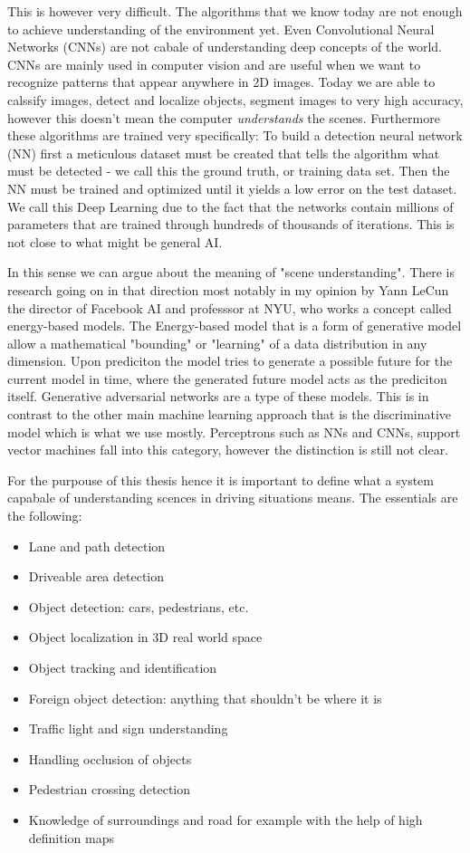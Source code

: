 This is however very difficult. The algorithms that we know today are not enough
to achieve understanding of the environment yet. Even Convolutional Neural
Networks (CNNs) are not cabale of understanding deep concepts of the world. CNNs
are mainly used in computer vision and are useful when we want to recognize
patterns that appear anywhere in 2D images. Today we are able to calssify
images, detect and localize objects, segment images to very high accuracy,
however this doesn't mean the computer \emph{understands} the scenes.
Furthermore these algorithms are trained very specifically: To build a detection
neural network (NN) first a meticulous dataset must be created that tells the
algorithm what must be detected - we call this the ground truth, or training
data set. Then the NN must be trained and optimized until it yields a low error
on the test dataset. We call this Deep Learning due to the fact that the networks
contain millions of parameters that are trained through hundreds of thousands of
iterations. This is not close to what might be general AI.

In this sense we can argue about the meaning of "scene understanding". There is
research going on in that direction most notably in my opinion by Yann LeCun the
director of Facebook AI and professsor at NYU, who works a concept called
energy-based models. The Energy-based model that is a form of generative model
allow a mathematical "bounding" or "learning" of a data distribution in any
dimension. Upon prediciton the model tries to generate a possible future for the
current model in time, where the generated future model acts as the prediciton
itself. Generative adversarial networks are a type of these models. This is in
contrast to the other main machine learning approach that is the discriminative
model which is what we use mostly. Perceptrons such as NNs and CNNs, support
vector machines fall into this category, however the distinction is still not
clear.

For the purpouse of this thesis hence it is important to define what a system
capabale of understanding scences in driving situations means. The essentials
are the following:
\begin{itemize}
    \item Lane  and path detection
    \item Driveable area detection
    \item Object detection: cars, pedestrians, etc.
    \item Object localization in 3D real world space
    \item Object tracking and identification
    \item Foreign object detection: anything that shouldn't be where it is
    \item Traffic light and sign understanding
    \item Handling occlusion of objects
    \item Pedestrian crossing detection
    \item Knowledge of surroundings and road for example with the help of
          high definition maps
\end{itemize}

